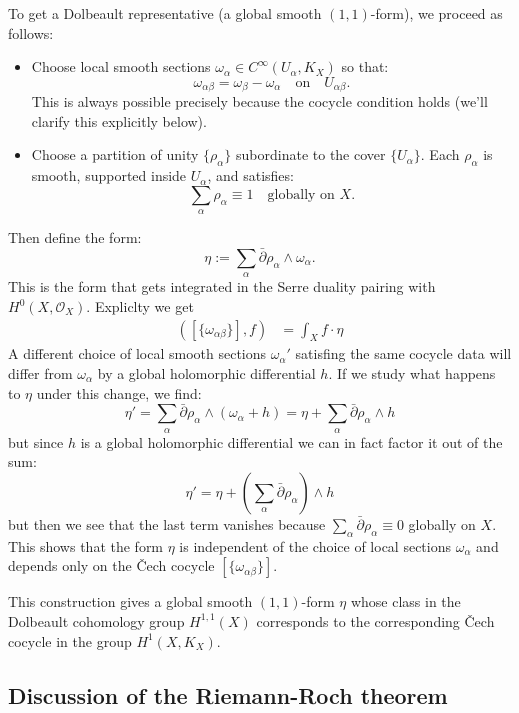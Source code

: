\documentclass[12pt]{article}
\begin{document}
To get a Dolbeault representative (a global smooth $(1,1)$-form), we proceed as follows:
\begin{itemize}
    \item Choose local smooth sections $\omega_\alpha\in C^\infty(U_\alpha,K_X)$ so that:
    \[
    \omega_{\alpha\beta}=\omega_\beta-\omega_\alpha\quad\text{on}\quad U_{\alpha\beta}.
    \]
    This is always possible precisely because the cocycle condition holds (we’ll clarify this explicitly below).
    \item Choose a partition of unity $\{\rho_\alpha\}$ subordinate to the cover $\{U_\alpha\}$. Each $\rho_\alpha$ is smooth, supported inside $U_\alpha$, and satisfies:
    \[
    \sum_\alpha \rho_\alpha\equiv 1\quad\text{globally on } X.
    \]
\end{itemize}

Then define the form:
\[
\eta:=\sum_\alpha \bar{\partial}\rho_\alpha\wedge \omega_\alpha.
\]
This is the form that gets integrated in the Serre duality pairing with $H^0(X,\mathcal{O}_X)$. Expliclty we get \begin{align*}
    ([\{\omega_{\alpha\beta}\}], f) &= \int_X f\cdot \eta
\end{align*}
A different choice of local smooth sections $\omega_\alpha'$ satisfing the same cocycle data will differ from $\omega_\alpha$ by a global holomorphic differential $h$. If we study what happens to $\eta$ under this change, we find:
$$\eta{\prime} = \sum_\alpha \bar{\partial}\rho_\alpha \wedge (\omega_\alpha + h) = \eta + \sum_\alpha \bar{\partial}\rho_\alpha \wedge h$$
but since $h$ is a global holomorphic differential we can in fact factor it out of the sum:
$$\eta{\prime} = \eta + \left(\sum_\alpha \bar{\partial}\rho_\alpha\right)\wedge h$$
but then we see that the last term vanishes because $\sum_\alpha \bar{\partial}\rho_\alpha\equiv 0$ globally on $X$. This shows that the form $\eta$ is independent of the choice of local sections $\omega_\alpha$ and depends only on the Čech cocycle $[\{\omega_{\alpha\beta}\}]$.

This construction gives a global smooth $(1,1)$-form $\eta$ whose class in the Dolbeault cohomology group $H^{1,1}(X)$ corresponds to the corresponding Čech cocycle in the group $H^1(X,K_X)$.

\subsection{Discussion of the Riemann-Roch theorem}
    
\end{document}
